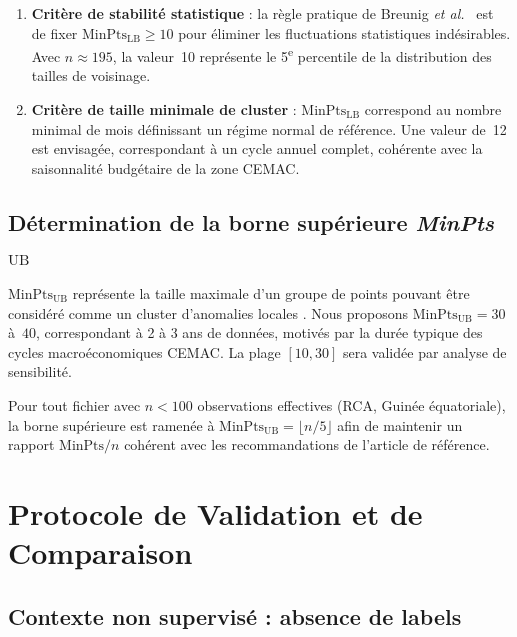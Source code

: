 \documentclass[12pt, a4paper]{article}
\begin{document}
\begin{enumerate}
    \item \textbf{Critère de stabilité statistique} : la règle pratique de
    Breunig \textit{et al.}~\cite{breunig2000lof} est de fixer
    $\text{MinPts}_\text{LB} \geq 10$ pour éliminer les fluctuations
    statistiques indésirables. Avec $n \approx 195$, la valeur~10 représente
    le 5\textsuperscript{e} percentile de la distribution des tailles de
    voisinage.

    \item \textbf{Critère de taille minimale de cluster} :
    $\text{MinPts}_\text{LB}$ correspond au nombre minimal de mois
    définissant un régime normal de référence. Une valeur de~12 est envisagée,
    correspondant à un cycle annuel complet, cohérente avec la saisonnalité
    budgétaire de la zone CEMAC.
\end{enumerate}

\subsection{Détermination de la borne supérieure
\textit{MinPts}$_\text{UB}$}
\label{subsec:borne_sup}

$\text{MinPts}_\text{UB}$ représente la taille maximale d'un groupe de points
pouvant être considéré comme un cluster d'anomalies locales
\cite{breunig2000lof}. Nous proposons $\text{MinPts}_\text{UB} = 30$
à~$40$, correspondant à 2 à 3 ans de données, motivés par la durée typique
des cycles macroéconomiques CEMAC. La plage $[10, 30]$ sera validée par
analyse de sensibilité.

Pour tout fichier avec $n < 100$ observations effectives (RCA, Guinée
équatoriale), la borne supérieure est ramenée à
$\text{MinPts}_\text{UB} = \lfloor n/5 \rfloor$ afin de maintenir un rapport
$\text{MinPts}/n$ cohérent avec les recommandations de l'article de référence.

\section{Protocole de Validation et de Comparaison}
\label{sec:validation}

\subsection{Contexte non supervisé : absence de labels}
\label{subsec:contexte_ns}
\end{document}

